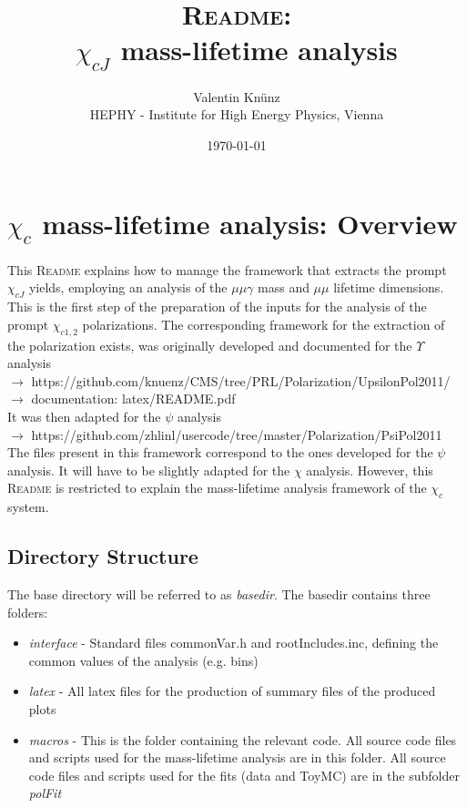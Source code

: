 \documentclass{article}
\begin{document}
\title{\textsc{Readme}:\\$\chi_{cJ}$ mass-lifetime analysis}
\author{Valentin Kn\"unz\\HEPHY - Institute for High Energy Physics, Vienna}
\date{\today}
\maketitle  


\tableofcontents
\newpage


\section{$\chi_c$ mass-lifetime analysis: Overview}

This \textsc{Readme} explains how to manage the framework that extracts the prompt $\chi_{cJ}$ yields, employing an analysis of the $\mu\mu\gamma$ mass and $\mu\mu$ lifetime dimensions. This is the first step of the preparation of the inputs for the analysis of the prompt $\chi_{c1,2}$ polarizations. The corresponding framework for the extraction of the polarization exists, was originally developed and documented for the $\Upsilon$ analysis
\\\hspace*{10pt}$\to$ https://github.com/knuenz/CMS/tree/PRL/Polarization/UpsilonPol2011/
\\\hspace*{10pt}$\to$ documentation: latex/README.pdf
\\It was then adapted for the $\psi$ analysis
\\\hspace*{10pt}$\to$ https://github.com/zhlinl/usercode/tree/master/Polarization/PsiPol2011
\\The files present in this framework correspond to the ones developed for the $\psi$ analysis. It will have to be slightly adapted for the $\chi$ analysis. However, this \textsc{Readme} is restricted to explain the mass-lifetime analysis framework of the $\chi_c$ system.

\subsection{Directory Structure}
The base directory will be referred to as \emph{basedir}. The basedir contains three folders:
\begin{itemize}
\item{\emph{interface} - Standard files commonVar.h and rootIncludes.inc, defining the common values of the analysis (e.g. bins)}
\item{\emph{latex} - All latex files for the production of summary files of the produced plots}
\item{\emph{macros} - This is the folder containing the relevant code. All source code files and scripts used for the mass-lifetime analysis are in this folder. All source code files and scripts used for the fits (data and ToyMC) are in the subfolder \emph{polFit}}
\end{itemize}
\end{document}

